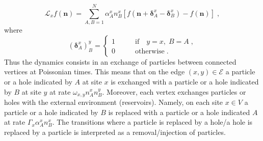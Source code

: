 \documentclass[10pt]{article}
\numberwithin{equation}{section}
\numberwithin{equation}{subsection}
\newcommand{\co}{\;,}
\newcommand{\dt}{\;.}
\newcommand{\fra}[1]{\textcolor[rgb]{0,0,1}{#1}}
\begin{document}
\begin{equation}\label{siteGenerator}
    \mathcal{L}_{x}f(\bm{n})=\sum_{A,B=1}^{N}\alpha_{A}^{x}n_{B}^{x}\left[f(\bm{n}+\bm{\delta}_{A}^{x}-\bm{\delta}_{B}^{x})-f(\bm{n})\right]\co
\end{equation}
where 
\begin{equation}
(\bm{\delta}_{A}^{x})^{y}_{B}=\begin{cases}
1\qquad &\text{if}\quad y=x,\;B=A\;,\\
0\qquad &\text{otherwise}\dt
\end{cases}
\end{equation}
Thus the dynamics consists in an exchange of particles between connected vertices at Poissonian times. 
This means that on the edge $(x,y)\in \mathcal{E}$  a particle {or a hole} indicated by $A$ at site $x$ is exchanged with a particle {or a hole} indicated by $B$ at site $y$ at rate $\omega_{x,y}n_{A}^{x}n_{B}^{y}$.
Moreover, each vertex  exchanges particles {or holes} with the external environment (reservoirs). 
Namely, on each site $x\in V$  a particle {or a hole} indicated by $B$ is replaced with a particle {or a hole} indicated $A$ at rate $\Gamma_{x}\alpha_{A}^{x}n_{B}^{x}$. {The transitions where \fra{a} particle is replaced by a hole/a hole is replaced by a particle is interpreted as a removal/injection of particles.}
\end{document}
